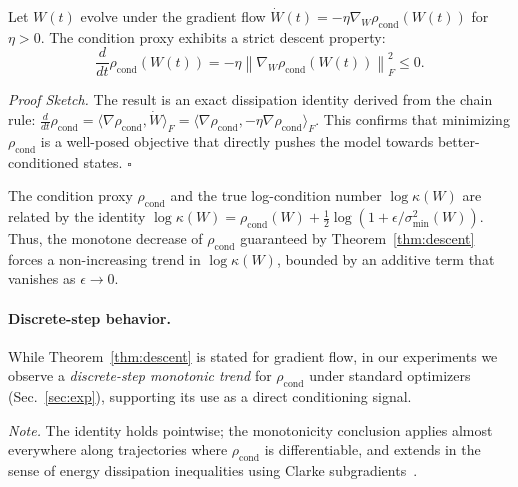 \documentclass{opt2025}
\newcommand{\norm}[1]{\left\lVert #1 \right\rVert}
\newcommand{\condproxy}{\rho_{\text{cond}}}
\begin{document}
\begin{theorem} \label{thm:descent}
Let $W(t)$ evolve under the gradient flow $\dot{W}(t) = -\eta\nabla_W \condproxy(W(t))$ for $\eta > 0$. The condition proxy exhibits a strict descent property:
$$\frac{d}{dt}\condproxy(W(t)) = -\eta\norm{\nabla_W\condproxy(W(t))}_F^2 \le 0.$$
\end{theorem}
\textit{Proof Sketch.} The result is an exact dissipation identity derived from the chain rule: $\frac{d}{dt}\condproxy = \langle\nabla\condproxy, \dot{W}\rangle_F = \langle\nabla\condproxy, -\eta\nabla\condproxy\rangle_F$. This confirms that minimizing $\condproxy$ is a well-posed objective that directly pushes the model towards better-conditioned states. \hfill$\square$

\begin{corollary} \label{cor:kappa_control}
The condition proxy $\condproxy$ and the true log-condition number $\log\kappa(W)$ are related by the identity $\log\kappa(W) = \condproxy(W) + \frac{1}{2}\log(1 + \epsilon/\sigma_{\min}^2(W))$. Thus, the monotone decrease of $\condproxy$ guaranteed by Theorem~\ref{thm:descent} forces a non-increasing trend in $\log\kappa(W)$, bounded by an additive term that vanishes as $\epsilon \to 0$.
\end{corollary}

\paragraph{Discrete-step behavior.}
While Theorem~\ref{thm:descent} is stated for gradient flow, in our experiments we observe a \emph{discrete-step monotonic trend} for $\rho_{\text{cond}}$ under standard optimizers (Sec.~\ref{sec:exp}), supporting its use as a direct conditioning signal.

\noindent\emph{Note.} The identity holds pointwise; the monotonicity conclusion applies almost everywhere along trajectories where $\rho_{\text{cond}}$ is differentiable, and extends in the sense of energy dissipation inequalities using Clarke subgradients~\citep{Lewis1996}.
\end{document}
